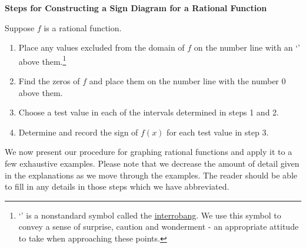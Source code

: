 \documentclass{ximera}
\begin{document}
\label{rationalsigndiagram}

\colorbox{ResultColor}{\bbm

\centerline{\textbf{Steps for Constructing a Sign Diagram for a  Rational Function}} 

\medskip

\hspace{.17in} Suppose $f$ is a rational function. 

\begin{enumerate}

\item  Place any values excluded from the domain of  $f$ on the number line with an `\textinterrobang' above them.\footnote{ `\textinterrobang' is a nonstandard symbol called the \href{http://en.wikipedia.org/wiki/Interrobang}{\underline{interrobang}}.   We use this symbol to convey a sense of surprise, caution and wonderment - an appropriate attitude to take when approaching these points.}   

\item  Find the zeros of $f$ and place them on the number line with the number $0$ above them.

\item  Choose a test value in each of the intervals determined in steps 1 and 2.

\item  Determine and record the sign of $f(x)$ for each test value in step 3.

\end{enumerate}

\ebm}

\medskip 

We now present our procedure for graphing rational functions and apply it to a few exhaustive examples.  Please note that we decrease the amount of detail given in the explanations as we move through the examples.  The reader should be able to fill in any details in those steps which we have abbreviated.

\medskip
\end{document}
